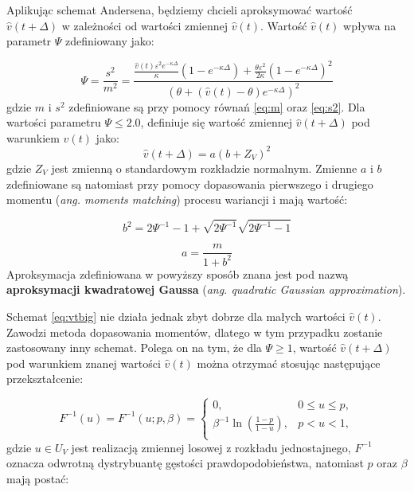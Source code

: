 \documentclass{pracamgr}
\begin{document}
Aplikując schemat Andersena, będziemy chcieli aproksymować wartość  $\hat{v}(t + \Delta)$ w 
zależności od wartości zmiennej $\hat{v}(t)$. Wartość $\hat{v}(t)$ wpływa na parametr 
$\Psi$ zdefiniowany jako:


\begin{equation}
 \label{eq:ksi}
 \Psi = \frac{s^2}{m^2} = \frac{\frac{\hat{v}(t)\varepsilon^2 e^{-\kappa \Delta}}{\kappa} 
 (1 - e^{-\kappa \Delta}) + \frac{\theta \varepsilon^2}{2 \kappa}(1 - e^{-\kappa \Delta})^2}
 {(\theta + (\hat{v}(t) - \theta) e^{-\kappa \Delta})^2} 
\end{equation}
gdzie $m$ i $s^2$ zdefiniowane są przy pomocy równań \ref{eq:m} oraz \ref{eq:s2}.
Dla wartości parametru $\Psi \leq 2.0$, definiuje się wartość zmiennej $\hat{v}(t + \Delta)$ pod 
warunkiem $\hat{v}(t)$ jako:
\begin{equation}
 \label{eq:vtbig}
\hat{v}(t + \Delta)  = a (b + Z_V)^2
\end{equation}
gdzie $Z_V$ jest zmienną o standardowym rozkładzie normalnym. Zmienne $a$ i $b$ zdefiniowane są 
natomiast przy pomocy dopasowania pierwszego i drugiego momentu (\textit{ang. moments matching}) 
procesu wariancji i mają wartość:


\begin{equation}
\label{eq:b}
b^2 = 2 \Psi^{-1} - 1 + \sqrt{2 \Psi^{-1}} \sqrt{2 \Psi^{-1} - 1}
\end{equation}

\begin{equation}
\label{eq:a}
a = \frac{m}{1 + b^2}
\end{equation}
Aproksymacja zdefiniowana w powyższy sposób znana jest pod nazwą 
\textbf{aproksymacji kwadratowej Gaussa} (\textit{ang. quadratic Gaussian approximation}).


Schemat \ref{eq:vtbig} nie działa jednak zbyt dobrze dla małych wartości $\hat{v}(t)$. Zawodzi metoda 
dopasowania momentów, dlatego w tym przypadku 
zostanie zastosowany inny schemat. Polega on na tym, że dla $\Psi \geq 1$, wartość 
$\hat{v}(t + \Delta)$ pod warunkiem znanej wartości $\hat{v}(t)$ można otrzymać 
stosując następujące przekształcenie:

\begin{equation}
\label{eq:psi}
F^{-1}(u) = F^{-1}(u;p,\beta) = \begin{cases}
               0, & 0 \le u \leq p,\\
               \beta^{-1} \ln (\frac{1-p}{1-u}), & p < u < 1, \\
            \end{cases} 
\end{equation} 
gdzie $u \in U_V$ jest realizacją zmiennej losowej z rozkładu jednostajnego, $F^{-1}$ oznacza
odwrotną dystrybuantę gęstości prawdopodobieństwa, natomiast $p$ oraz $\beta$ mają postać:
\end{document}

